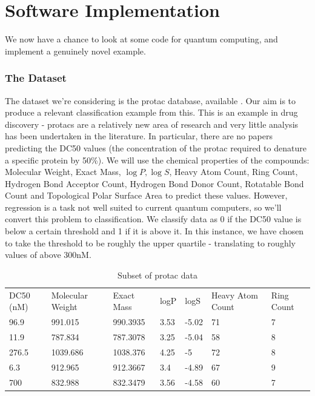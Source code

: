 \documentclass{article}
\theoremstyle{definition}
\begin{document}
\clearpage
\part{Software Implementation}
We now have a chance to look at some code for quantum computing, and implement a genuinely novel example.
\section{The Dataset}
The dataset we're considering is the protac database, available \cite{10.1093/nar/gkaa807}. Our aim is to produce a relevant classification example from this. This is an example in drug discovery - protacs are a relatively new area of research and very little analysis has been undertaken in the literature. In particular, there are no papers predicting the DC50 values (the concentration of the protac required to denature a specific protein by 50\%). We will use the chemical properties of the compounds: Molecular Weight, Exact Mass, $\log P, \log S$, Heavy Atom Count, Ring Count, Hydrogen Bond Acceptor Count, Hydrogen Bond Donor Count, Rotatable Bond Count and	Topological Polar Surface Area to predict these values. However, regression is a task not well suited to current quantum computers, so we'll convert this problem to classification. We classify data as 0 if the DC50 value is below a certain threshold and 1 if it is above it. In this instance, we have chosen to take the threshold to be roughly the upper quartile - translating to roughly values of above 300nM.

\begin{table}[htb]
\begin{tabular}[scale=0.5]{lllllll}
DC50 (nM) & Molecular Weight & Exact Mass & logP & logS  & Heavy Atom Count & Ring Count  \\
96.9      & 991.015          & 990.3935   & 3.53 & -5.02 & 71               & 7                                   \\
11.9      & 787.834          & 787.3078   & 3.25 & -5.04 & 58               & 8                               \\
276.5     & 1039.686         & 1038.376   & 4.25 & -5    & 72               & 8                               \\
6.3       & 912.965          & 912.3667   & 3.4  & -4.89 & 67               & 9                                \\
700       & 832.988          & 832.3479   & 3.56 & -4.58 & 60               & 7                                  
\end{tabular}
\caption{Subset of protac data}
\end{table}
\end{document}
